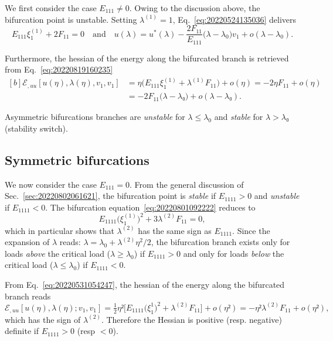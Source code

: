 \documentclass[12pt, final]{scrartcl}
\theoremstyle{definition}
\newcommand{\E}{\mathcal E}
\newcommand{\order}[2][1]{#2^{(#1)}}
\begin{document}
We first consider the case $E_{111} ≠ 0$. Owing to the discussion above, the
bifurcation point is unstable. Setting $\order[1]\lambda = 1$,
Eq.~\eqref{eq:20220524135036} delivers
\begin{equation}
  E_{111} \order[1]ξ_1 + 2F_{11} = 0 \quad \text{and} \quad u(\lambda) = u^\ast(\lambda) - \frac{2F_{11}}{E_{111}} \bigl( \lambda - \lambda_0 \bigr) v_1 + o(\lambda - \lambda_0).
\end{equation}

Furthermore, the hessian of the energy along the bifurcated branch is retrieved
from Eq.~\eqref{eq:20220819160235}
\begin{equation}
  \begin{aligned}[b]
    \E_{, uu}[u(η), \lambda(η), v_1, v_1] &= η \bigl(E_{111} \order[1]{ξ_1} + \order[1]\lambda F_{11}\bigr) + o(η) = -2 η F_{11} + o(η)\\
    &= -2 F_{11} \bigl( \lambda - \lambda₀ \bigr) + o(\lambda - \lambda₀).
  \end{aligned}
\end{equation}

Asymmetric bifurcations branches are \emph{unstable} for $\lambda ≤ \lambda_0$ and
\emph{stable} for $\lambda > \lambda₀$ (stability switch).

\subsection{Symmetric bifurcations}

We now consider the case $E_{111}=0$. From the general discussion of
Sec.~\ref{sec:20220802061621}, the bifurcation point is \emph{stable} if
$E_{1111} > 0$ and \emph{unstable} if $E_{1111} < 0$. The bifurcation
equation~\eqref{eq:20220801092222} reduces to
\begin{equation}
  E_{1111} \bigl( \order[1]{ξ_1} \bigr)^2 + 3\order[2]\lambda F_{11} = 0,
\end{equation}
which in particular shows that $\order[2]\lambda$ has the same sign as
$E_{1111}$. Since the expansion of $\lambda$ reads:
$\lambda = \lambda_0 + \order[2]\lambda η^2 / 2$, the bifurcation branch exists only for loads
\emph{above} the critical load ($\lambda ≥ \lambda_0$) if $E_{1111} > 0$ and only for
loads \emph{below} the critical load ($\lambda ≤ \lambda_0$) if $E_{1111} < 0$.

From Eq.~\eqref{eq:20220531054247}, the hessian of the energy along the
bifurcated branch reads
\begin{equation*}
  \E_{, uu}[u(η), \lambda(η); v_1, v_1] = \tfrac{1}{2} η² \bigl[ E_{1111}\bigl(ξ_1^1\bigr) ^2 + \order[2]\lambda F_{11} \bigr] + o(η²) = - η² \order[2]\lambda F_{11} + o(η²),
\end{equation*}
which has the sign of $\order[2]\lambda$. Therefore the Hessian is positive
(resp. negative) definite if $E_{1111} > 0$ (resp $< 0$).
\end{document}
